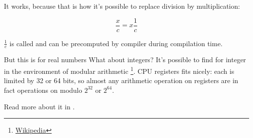 It works, because that is how it's possible to replace division by multiplication:

\[
	\frac{x}{c} = x\frac{1}{c}
\]

$\frac{1}{c}$ is called  and can be precomputed by compiler during compilation
time.

But this is for real numbers
What about integers?
It's possible to find  for integer in the environment of modular arithmetic
\footnote{\href{http://go.yurichev.com/17359}{Wikipedia}}.
\ac{CPU} registers fits nicely: each is limited by 32 or 64 bits, so almost any arithmetic operation on registers are in fact
operations on modulo $2^{32}$ or $2^{64}$.

Read more about it in .

